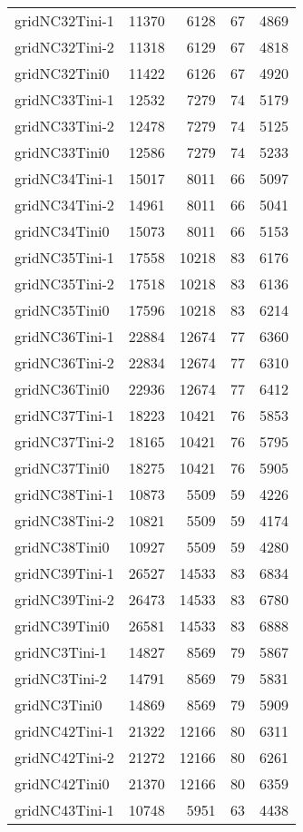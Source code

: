 \begin{longtable}{lrrrr}
gridNC32Tini-1 & 11370 & 6128 & 67 & 4869 \\
gridNC32Tini-2 & 11318 & 6129 & 67 & 4818 \\
gridNC32Tini0 & 11422 & 6126 & 67 & 4920 \\
gridNC33Tini-1 & 12532 & 7279 & 74 & 5179 \\
gridNC33Tini-2 & 12478 & 7279 & 74 & 5125 \\
gridNC33Tini0 & 12586 & 7279 & 74 & 5233 \\
gridNC34Tini-1 & 15017 & 8011 & 66 & 5097 \\
gridNC34Tini-2 & 14961 & 8011 & 66 & 5041 \\
gridNC34Tini0 & 15073 & 8011 & 66 & 5153 \\
gridNC35Tini-1 & 17558 & 10218 & 83 & 6176 \\
gridNC35Tini-2 & 17518 & 10218 & 83 & 6136 \\
gridNC35Tini0 & 17596 & 10218 & 83 & 6214 \\
gridNC36Tini-1 & 22884 & 12674 & 77 & 6360 \\
gridNC36Tini-2 & 22834 & 12674 & 77 & 6310 \\
gridNC36Tini0 & 22936 & 12674 & 77 & 6412 \\
gridNC37Tini-1 & 18223 & 10421 & 76 & 5853 \\
gridNC37Tini-2 & 18165 & 10421 & 76 & 5795 \\
gridNC37Tini0 & 18275 & 10421 & 76 & 5905 \\
gridNC38Tini-1 & 10873 & 5509 & 59 & 4226 \\
gridNC38Tini-2 & 10821 & 5509 & 59 & 4174 \\
gridNC38Tini0 & 10927 & 5509 & 59 & 4280 \\
gridNC39Tini-1 & 26527 & 14533 & 83 & 6834 \\
gridNC39Tini-2 & 26473 & 14533 & 83 & 6780 \\
gridNC39Tini0 & 26581 & 14533 & 83 & 6888 \\
gridNC3Tini-1 & 14827 & 8569 & 79 & 5867 \\
gridNC3Tini-2 & 14791 & 8569 & 79 & 5831 \\
gridNC3Tini0 & 14869 & 8569 & 79 & 5909 \\
gridNC42Tini-1 & 21322 & 12166 & 80 & 6311 \\
gridNC42Tini-2 & 21272 & 12166 & 80 & 6261 \\
gridNC42Tini0 & 21370 & 12166 & 80 & 6359 \\
gridNC43Tini-1 & 10748 & 5951 & 63 & 4438 \\

\end{longtable}

